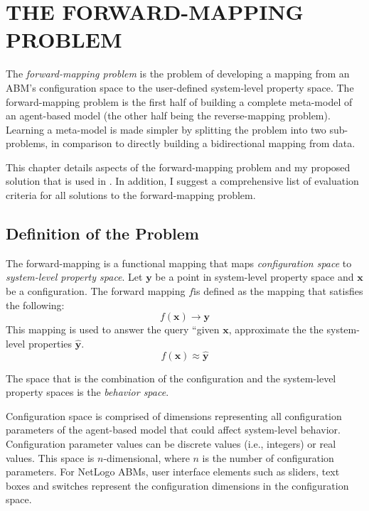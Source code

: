 \chapter{THE FORWARD-MAPPING PROBLEM}
\thispagestyle{plain}

\label{ForwardMapping}

The \textit{forward-mapping problem} is the problem of developing a mapping from an ABM's configuration space to the user-defined system-level property space.
The forward-mapping problem is the first half of building a complete meta-model of an agent-based model (the other half being the reverse-mapping problem).
Learning a meta-model is made simpler by splitting the problem into two sub-problems, in comparison to directly building a bidirectional mapping from data.

This chapter details aspects of the forward-mapping problem and my proposed solution that is used in \fw.
In addition, I suggest a comprehensive list of evaluation criteria for all solutions to the forward-mapping problem.

\section{Definition of the Problem}
The forward-mapping is a functional mapping that maps \textit{configuration space} to \textit{system-level property space}.
Let $\mathbf{y}$ be a point in system-level property space and $\mathbf x$ be a configuration.
The forward mapping $f$is defined as the mapping that satisfies the following:
\[ f(\mathbf x) \rightarrow \mathbf{y} \]
This mapping is used to answer the query ``given $\mathbf x$, approximate the the system-level properties  $\hat{\mathbf y}$.
\[ f(\mathbf x) \approx \hat{\mathbf y} \]

The space that is the combination of the configuration and the system-level property spaces is the \textit{behavior space}.

Configuration space is comprised of dimensions representing all configuration parameters of the agent-based model that could affect system-level behavior.
Configuration parameter values can be discrete values (i.e., integers) or real values.
This space is $n$-dimensional, where $n$ is the number of configuration parameters.
For NetLogo ABMs, user interface elements such as sliders, text boxes and switches represent the configuration dimensions in the configuration space.


